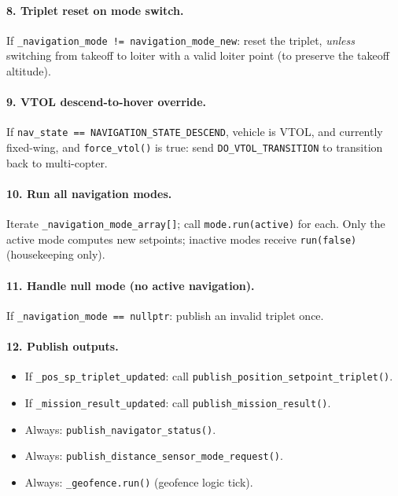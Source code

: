 \documentclass[12pt,a4paper]{article}
\begin{document}
\paragraph{8. Triplet reset on mode switch.}
If \texttt{\_navigation\_mode != navigation\_mode\_new}: reset the triplet,
\emph{unless} switching from takeoff to loiter with a valid loiter point
(to preserve the takeoff altitude).

\paragraph{9. VTOL descend-to-hover override.}
If \texttt{nav\_state == NAVIGATION\_STATE\_DESCEND}, vehicle is VTOL, and
currently fixed-wing, and \texttt{force\_vtol()} is true: send
\texttt{DO\_VTOL\_TRANSITION} to transition back to multi-copter.

\paragraph{10. Run all navigation modes.}
Iterate \texttt{\_navigation\_mode\_array[]}; call \texttt{mode.run(active)}
for each. Only the active mode computes new setpoints; inactive modes receive
\texttt{run(false)} (housekeeping only).

\paragraph{11. Handle null mode (no active navigation).}
If \texttt{\_navigation\_mode == nullptr}: publish an invalid triplet once.

\paragraph{12. Publish outputs.}
\begin{itemize}
  \item If \texttt{\_pos\_sp\_triplet\_updated}: call
        \texttt{publish\_position\_setpoint\_triplet()}.
  \item If \texttt{\_mission\_result\_updated}: call
        \texttt{publish\_mission\_result()}.
  \item Always: \texttt{publish\_navigator\_status()}.
  \item Always: \texttt{publish\_distance\_sensor\_mode\_request()}.
  \item Always: \texttt{\_geofence.run()} (geofence logic tick).
\end{itemize}

\end{document}

